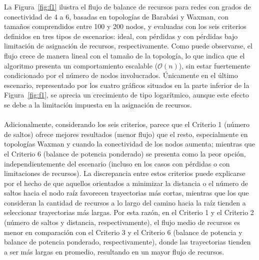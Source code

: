 La Figura~\ref{fig:f1} ilustra el flujo de balance de recursos para redes con grados de conectividad de 4 a 6, basadas en topologías de Barabási y Waxman, con tamaños comprendidos entre 100 y 200 nodos, y evaluadas con los seis criterios definidos en tres tipos de escenarios: ideal, con pérdidas y con pérdidas bajo limitación de asignación de recursos, respectivamente. Como puede observarse, el flujo crece de manera lineal con el tamaño de la topología, lo que indica que el algoritmo presenta un comportamiento escalable ($\mathcal{O}(n)$), sin estar fuertemente condicionado por el número de nodos involucrados. Únicamente en el último escenario, representado por los cuatro gráficos situados en la parte inferior de la Figura~\ref{fig:f1}, se aprecia un crecimiento de tipo logarítmico, aunque este efecto se debe a la limitación impuesta en la asignación de recursos.\\
\\
Adicionalmente, considerando los seis criterios, parece que el Criterio 1 (número de saltos) ofrece mejores resultados (menor flujo) que el resto, especialmente en topologías Waxman y cuando la conectividad de los nodos aumenta; mientras que el Criterio 6 (balance de potencia ponderado) se presenta como la peor opción, independientemente del escenario (incluso en los casos con pérdidas o con limitaciones de recursos). La discrepancia entre estos criterios puede explicarse por el hecho de que aquellos orientados a minimizar la distancia o el número de saltos hacia el nodo raíz favorecen trayectorias más cortas, mientras que los que consideran la cantidad de recursos a lo largo del camino hacia la raíz tienden a seleccionar trayectorias más largas. Por esta razón, en el Criterio 1 y el Criterio 2 (número de saltos y distancia, respectivamente), el flujo medio de recursos es menor en comparación con el Criterio 3 y el Criterio 6 (balance de potencia y balance de potencia ponderado, respectivamente), donde las trayectorias tienden a ser más largas en promedio, resultando en un mayor flujo de recursos.\\
\\

